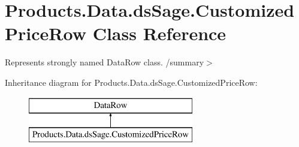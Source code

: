 \hypertarget{class_products_1_1_data_1_1ds_sage_1_1_customized_price_row}{}\section{Products.\+Data.\+ds\+Sage.\+Customized\+Price\+Row Class Reference}
\label{class_products_1_1_data_1_1ds_sage_1_1_customized_price_row}


Represents strongly named Data\+Row class. /summary$>$  


Inheritance diagram for Products.\+Data.\+ds\+Sage.\+Customized\+Price\+Row\+:\begin{figure}[H]
\begin{center}
\leavevmode
\includegraphics[height=2.000000cm]{class_products_1_1_data_1_1ds_sage_1_1_customized_price_row}
\end{center}
\end{figure}
